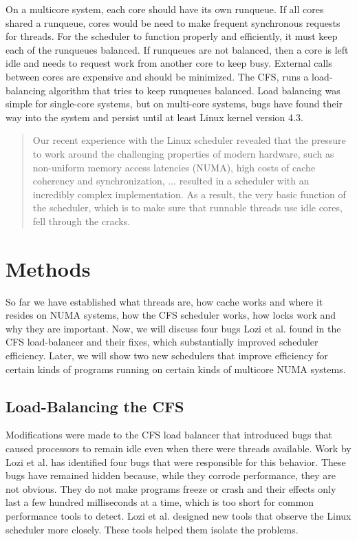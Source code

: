 \documentclass{sig-alternate}
\begin{document}
On a multicore system, each core should have its own runqueue. If all cores shared a runqueue, cores would be need to make frequent synchronous requests for threads. For the scheduler to function properly and efficiently, it must keep each of the runqueues balanced. If runqueues are not balanced, then a core is left idle and needs to request work from another core to keep busy. External calls between cores are expensive and should be minimized. The CFS, runs a load-balancing algorithm that tries to keep runqueues balanced. Load balancing was simple for single-core systems, but on multi-core systems, bugs have found their way into the system and persist until at least Linux kernel version 4.3.~\cite{Lozi:2016}

\begin{quote}
Our recent experience with the Linux scheduler revealed that the pressure to work around the challenging properties of modern hardware, such as non-uniform memory access latencies (NUMA), high costs of cache coherency and synchronization, ... resulted in a scheduler with an incredibly complex implementation. As a result, the very basic function of the scheduler, which is to make sure that runnable threads use idle cores, fell through the cracks.~\cite{Lozi:2016}
\end{quote}

\section{Methods}
\label{sec:methods}

So far we have established what threads are, how cache works and where it resides on NUMA systems, how the CFS scheduler works, how locks work and why they are important. Now, we will discuss four bugs Lozi et al. found in the CFS load-balancer and their fixes, which substantially improved scheduler efficiency. Later, we will show two new schedulers that improve efficiency for certain kinds of programs running on certain kinds of multicore NUMA systems.

\subsection{Load-Balancing the CFS}
\label{sec:loadbalance}

Modifications were made to the CFS load balancer that introduced bugs that caused processors to remain idle even when there were threads available. Work by Lozi et al. has identified four bugs that were responsible for this behavior. These bugs have remained hidden because, while they corrode performance, they are not obvious. They do not make programs freeze or crash and their effects only last a few hundred milliseconds at a time, which is too short for common performance tools to detect. Lozi et al. designed new tools that observe the Linux scheduler more closely. These tools helped them isolate the problems.~\cite{Lozi:2016}
\end{document}
